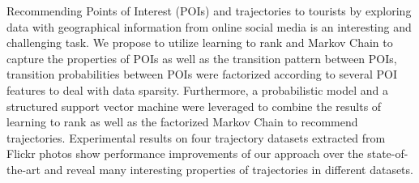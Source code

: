 Recommending Points of Interest (POIs) and trajectories to tourists by exploring data with 
geographical information from online social media is an interesting and challenging task.
We propose to utilize learning to rank and Markov Chain to capture the properties of POIs
as well as the transition pattern between POIs, transition probabilities between POIs were
factorized according to several POI features to deal with data sparsity.
Furthermore, a probabilistic model and a structured support vector machine were leveraged 
to combine the results of learning to rank as well as the factorized Markov Chain to recommend trajectories.
Experimental results on four trajectory datasets extracted from Flickr photos show performance 
improvements of our approach over the state-of-the-art and reveal many interesting properties 
of trajectories in different datasets.
